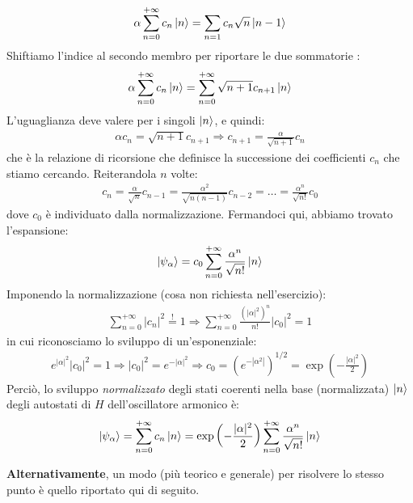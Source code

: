 \documentclass[../../FisicaTeorica.tex]{subfiles}
\begin{document}
\begin{enumerate}
\begin{align*}
\alpha \sum_{n=0}^{+\infty} c_n \Ket{n} = \sum_{n=1} c_n\sqrt{n}\Ket{n-1}
\end{align*}
Shiftiamo l'indice al secondo membro per riportare le due sommatorie :
\begin{align*}
\alpha \sum_{n=0}^{+\infty} c_n \Ket{n} = \sum_{n=0}^{+\infty} \sqrt{n+1} c_{n+1} \Ket{n}
\end{align*}
L'uguaglianza deve valere per i singoli $\Ket{n}$, e quindi:
\begin{align*}
\alpha c_n = \sqrt{n+1} c_{n+1} \Rightarrow  c_{n+1} = \frac{\alpha}{\sqrt{n+1}} c_n
\end{align*}
che è la relazione di ricorsione che definisce la successione dei coefficienti $c_n$ che stiamo cercando. Reiterandola $n$ volte:
\begin{align*}
c_n = \frac{\alpha}{\sqrt{n}} c_{n-1} = \frac{\alpha^2}{\sqrt{n(n-1)}} c_{n-2} = \dots = \frac{\alpha^n}{\sqrt{n!}}c_0
\end{align*}
dove $c_0$ è individuato dalla normalizzazione. Fermandoci qui, abbiamo trovato l'espansione:
\begin{align*}
\Ket{\psi_\alpha} =c_0 \sum_{n=0}^{+\infty} \frac{\alpha^n}{\sqrt{n!}} \Ket{n}
\end{align*}
Imponendo la normalizzazione (cosa non richiesta nell'esercizio):
\begin{align*}
\sum_{n=0}^{+\infty} |c_n|^2 \overset{!}{=} 1 \Rightarrow  \sum_{n=0}^{+\infty} \frac{(|\alpha|^2)^n}{n!} |c_0|^2 = 1
\end{align*}
in cui riconosciamo lo sviluppo di un'esponenziale:
\begin{align*}
e^{|\alpha|^2}|c_0|^2 = 1 \Rightarrow  |c_0|^2 = e^{-|\alpha|^2} \Rightarrow  c_0 = (e^{-|\alpha^2|})^{1/2} = \exp\left(-\frac{|\alpha|^2}{2}\right)
\end{align*}
Perciò, lo sviluppo \textit{normalizzato} degli stati coerenti nella base (normalizzata) $\Ket{n}$ degli autostati di $H$ dell'oscillatore armonico è:
\begin{align*}
\Ket{\psi_\alpha} = \sum_{n=0}^{+\infty} c_n \Ket{n} = \exp\left(-\frac{|\alpha|^2}{2}\right) \sum_{n=0}^{+\infty} \frac{\alpha^n}{\sqrt{n!}}\Ket{n}
\end{align*}

\textbf{Alternativamente}, un modo (più teorico e generale) per risolvere lo stesso punto è quello riportato qui di seguito.\\


\end{enumerate}
\end{document}
